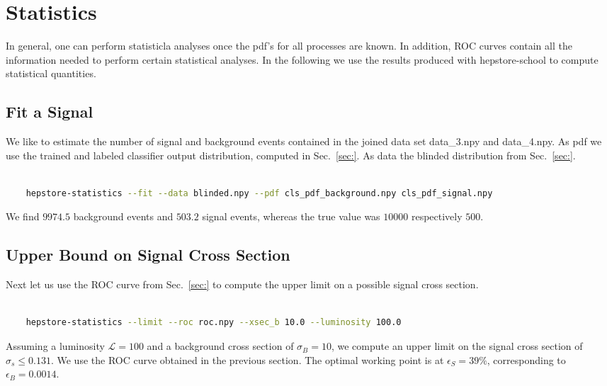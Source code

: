 
\section{Statistics}

In general, one can perform statisticla analyses once the pdf's for
all processes are known. In addition, ROC curves contain all the
information needed to perform certain statistical analyses. In the
following we use the results produced with hepstore-school to compute
statistical quantities.

\subsection{Fit a Signal}
We like to estimate the number of signal and background events
contained in the joined data set data\_3.npy and data\_4.npy. As pdf
we use the trained and labeled classifier output distribution,
computed in Sec.~\ref{sec:}. As data the blinded distribution from
Sec.~\ref{sec:}.
%
\begin{changemargin}{1.5cm}{1.5cm} 
  \begin{lstlisting}[language=Bash]
    
    hepstore-statistics --fit --data blinded.npy --pdf cls_pdf_background.npy cls_pdf_signal.npy
  \end{lstlisting}
\end{changemargin}
%
We find $9974.5$ background events and $503.2$ signal events, whereas
the true value was $10000$ respectively $500$.

\subsection{Upper Bound on Signal Cross Section}
Next let us use the ROC curve from Sec.~\ref{sec:} to compute the
upper limit on a possible signal cross section. 
%
\begin{changemargin}{1.5cm}{1.5cm} 
  \begin{lstlisting}[language=Bash]
    
    hepstore-statistics --limit --roc roc.npy --xsec_b 10.0 --luminosity 100.0
  \end{lstlisting}
\end{changemargin}
%
Assuming a luminosity $\mathcal{L} = 100$ and a background cross
section of $\sigma_B = 10$, we compute an upper limit on the signal
cross section of $\sigma_s \le 0.131$. We use the ROC curve obtained
in the previous section. The optimal working point is at $\epsilon_S =
39\%$, corresponding to $\epsilon_B = 0.0014$.

